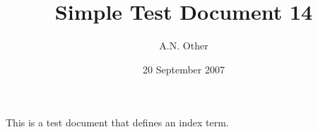 \documentclass{article}
\date{20 September 2007}
\author{A.N. Other}
\title{Simple Test Document 14}
\begin{document}
\maketitle

This is a test document that def{}ines an index term.
\printindex
\end{document}
